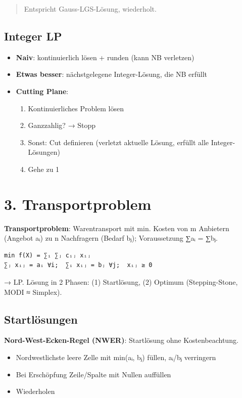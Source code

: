\documentclass[11pt, a4paper]{article}
\begin{document}
\begin{quote}
Entspricht Gauss-LGS-Lösung, wiederholt.
\end{quote}


\subsection{Integer LP}
\begin{itemize}
  \item \textbf{Naiv}: kontinuierlich lösen + runden (kann NB verletzen)
  \item \textbf{Etwas besser}: nächstgelegene Integer-Lösung, die NB erfüllt
  \item \textbf{Cutting Plane}:
\begin{enumerate}
  \item Kontinuierliches Problem lösen
  \item Ganzzahlig? → Stopp
  \item Sonst: Cut definieren (verletzt aktuelle Lösung, erfüllt alle Integer-Lösungen)
  \item Gehe zu 1
\end{enumerate}
\end{itemize}


\section{3. Transportproblem}

\textbf{Transportproblem}: Warentransport mit min. Kosten von m Anbietern (Angebot aᵢ) zu n Nachfragern (Bedarf bⱼ); Voraussetzung ∑aᵢ = ∑bⱼ.


\begin{lstlisting}
min f(X) = ∑ᵢ ∑ⱼ cᵢⱼ xᵢⱼ
∑ⱼ xᵢⱼ = aᵢ ∀i;  ∑ᵢ xᵢⱼ = bⱼ ∀j;  xᵢⱼ ≥ 0
\end{lstlisting}


→ LP. Lösung in 2 Phasen: (1) Startlösung, (2) Optimum (Stepping-Stone, MODI ≈ Simplex).



\subsection{Startlösungen}

\textbf{Nord-West-Ecken-Regel (NWER)}: Startlösung ohne Kostenbeachtung.

\begin{itemize}
  \item Nordwestlichste leere Zelle mit min(aᵢ, bⱼ) füllen, aᵢ/bⱼ verringern
  \item Bei Erschöpfung Zeile/Spalte mit Nullen auffüllen
  \item Wiederholen
\end{itemize}
\end{document}

